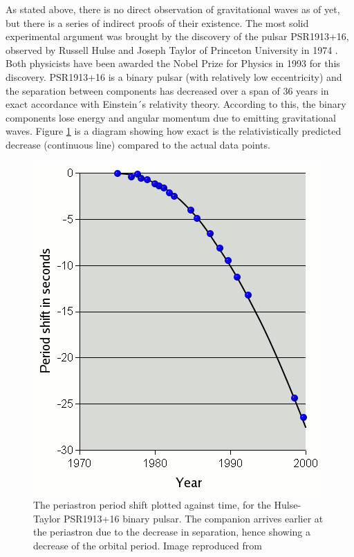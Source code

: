 \documentclass[epsf]{article}
\begin{document}
As stated above, there is no direct observation of gravitational waves as of yet, but there is a series of indirect proofs of their existence. The most solid experimental argument was brought by the discovery of the pulsar PSR1913+16, observed by Russell Hulse and Joseph Taylor of Princeton University in 1974 \cite{hulsetaylor}. Both physicists have been awarded the Nobel Prize for Physics in 1993 for this discovery. PSR1913+16 is a binary pulsar (with relatively low eccentricity) and the separation between components has decreased over a span of 36 years in exact accordance with Einstein´s relativity theory. According to this, the binary components lose energy and angular momentum due to emitting gravitational waves. Figure \ref{fig:hulsepulsar} is a diagram showing how exact is the relativistically predicted decrease (continuous line) compared to the actual data points. 

\begin{figure}[ht]
\centering
\includegraphics[scale=0.50]{PSR.png}
\caption{The periastron period shift plotted against time, for the Hulse-Taylor PSR1913+16 binary pulsar. The companion arrives earlier at the periastron due to the decrease in separation, hence showing a decrease of the orbital period. Image reproduced from \cite{wikiPSR}}
\label{fig:hulsepulsar}
\end{figure}
  
\end{document}
